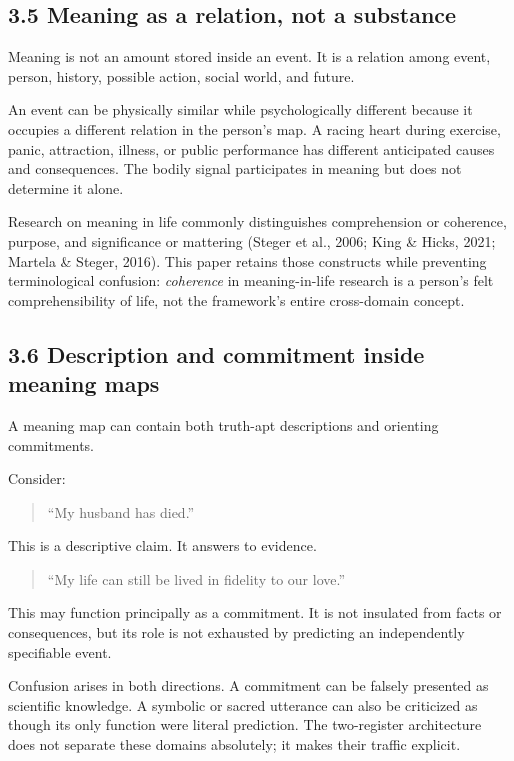 \documentclass[
  11pt,
]{article}
\begin{document}
\subsection{3.5 Meaning as a relation, not a
substance}\label{meaning-as-a-relation-not-a-substance}

Meaning is not an amount stored inside an event. It is a relation among
event, person, history, possible action, social world, and future.

An event can be physically similar while psychologically different
because it occupies a different relation in the person's map. A racing
heart during exercise, panic, attraction, illness, or public performance
has different anticipated causes and consequences. The bodily signal
participates in meaning but does not determine it alone.

Research on meaning in life commonly distinguishes comprehension or
coherence, purpose, and significance or mattering (Steger et al., 2006;
King \& Hicks, 2021; Martela \& Steger, 2016). This paper retains those
constructs while preventing terminological confusion: \emph{coherence}
in meaning-in-life research is a person's felt comprehensibility of
life, not the framework's entire cross-domain concept.

\subsection{3.6 Description and commitment inside meaning
maps}\label{description-and-commitment-inside-meaning-maps}

A meaning map can contain both truth-apt descriptions and orienting
commitments.

Consider:

\begin{quote}
``My husband has died.''
\end{quote}

This is a descriptive claim. It answers to evidence.

\begin{quote}
``My life can still be lived in fidelity to our love.''
\end{quote}

This may function principally as a commitment. It is not insulated from
facts or consequences, but its role is not exhausted by predicting an
independently specifiable event.

Confusion arises in both directions. A commitment can be falsely
presented as scientific knowledge. A symbolic or sacred utterance can
also be criticized as though its only function were literal prediction.
The two-register architecture does not separate these domains
absolutely; it makes their traffic explicit.
\end{document}
